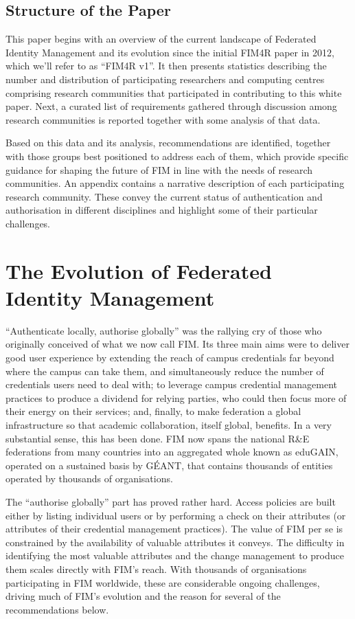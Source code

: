 \documentclass[fleqn,10pt]{wlscirep}
\begin{document}
{\subsection{Structure of the Paper}
This paper begins with an overview of the current landscape of Federated Identity Management and its evolution since the initial FIM4R paper\cite{FIM4Rv1:2012} in 2012, which we’ll refer to as “FIM4R v1”. It then presents statistics describing the number and distribution of participating researchers and computing centres comprising research communities that participated in contributing to this white paper. Next, a curated list of requirements gathered through discussion among research communities is reported together with some analysis of that data. 

Based on this data and its analysis, recommendations are identified, together with those groups best positioned to address each of them, which provide specific guidance for shaping the future of FIM in line with the needs of research communities. An appendix contains a narrative description of each participating research community. These convey the current status of authentication and authorisation in different disciplines and highlight some of their particular challenges. 

\section{The Evolution of Federated Identity Management}
“Authenticate locally, authorise globally” was the rallying cry of those who originally conceived of what we now call FIM. Its three main aims were to deliver good user experience by extending the reach of campus credentials far beyond where the campus can take them, and simultaneously reduce the number of credentials users need to deal with; to leverage campus credential management practices to produce a dividend for relying parties, who could then focus more of their energy on their services; and, finally, to make federation a global infrastructure so that academic collaboration, itself global, benefits. In a very substantial sense, this has been done. FIM now spans the national R\&E federations from many countries into an aggregated whole known as eduGAIN, operated on a sustained basis by GÉANT, that contains thousands of entities operated by thousands of organisations. 

The “authorise globally” part has proved rather hard. Access policies are built either by listing individual users or by performing a check on their attributes (or attributes of their credential management practices). The value of FIM per se is constrained by the availability of valuable attributes it conveys. The difficulty in identifying the most valuable attributes and the change management to produce them scales directly with FIM’s reach. With thousands of organisations participating in FIM worldwide, these are considerable ongoing challenges, driving much of FIM’s evolution and the reason for several of the recommendations below. 

}
\end{document}
